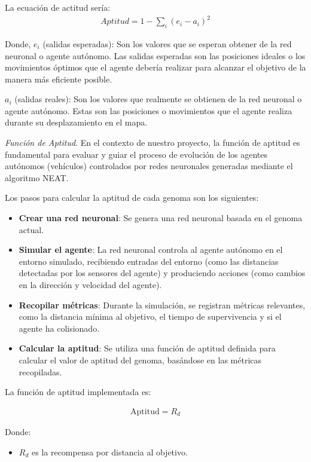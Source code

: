 \documentclass[conference]{IEEEtran}
\begin{document}
La ecuación de actitud sería:
\begin{align*}
    Aptitud = 1 - \sum_{i} (e_i - a_i)^2
\end{align*}

Donde, $e_i$ (salidas esperadas): Son los valores que se esperan obtener de la red neuronal o agente autónomo. Las salidas esperadas son las posiciones ideales o los movimientos óptimos que el agente debería realizar para alcanzar el objetivo de la manera más eficiente posible. 

$a_i$ (salidas reales): Son los valores que realmente se obtienen de la red neuronal o agente autónomo. Estas son las posiciones o movimientos que el agente realiza durante su desplazamiento en el mapa.


\textit{Función de Aptitud}. En el contexto de nuestro proyecto, la función de aptitud es fundamental para evaluar y guiar el proceso de evolución de los agentes autónomos (vehículos) controlados por redes neuronales generadas mediante el algoritmo NEAT. 

Los pasos para calcular la aptitud de cada genoma son los siguientes:

\begin{itemize} 
\item \textbf{Crear una red neuronal}: Se genera una red neuronal basada en el genoma actual. 
\item \textbf{Simular el agente}: La red neuronal controla al agente autónomo en el entorno simulado, recibiendo entradas del entorno (como las distancias detectadas por los sensores del agente) y produciendo acciones (como cambios en la dirección y velocidad del agente). 
\item \textbf{Recopilar métricas}: Durante la simulación, se registran métricas relevantes, como la distancia mínima al objetivo, el tiempo de supervivencia y si el agente ha colisionado. 
\item \textbf{Calcular la aptitud}: Se utiliza una función de aptitud definida para calcular el valor de aptitud del genoma, basándose en las métricas recopiladas. 

\end{itemize}

La función de aptitud implementada es:

\begin{align*} 
    \text{Aptitud} = R_d
\end{align*}

Donde:
\begin{itemize} 
\item $R_d$ es la recompensa por distancia al objetivo. 
 \end{itemize}
\end{document}
